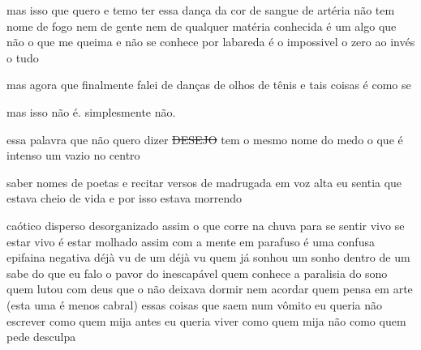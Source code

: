 \begin{poem}
\begin{stanza}
\end{stanza}
\begin{stanza}
mas isso que quero\verseline
e temo ter\verseline
essa dança da cor\verseline
de sangue de artéria\verseline
não tem nome de fogo\verseline
nem de gente\verseline
nem de qualquer\verseline
matéria conhecida\verseline
é um algo que não\verseline
o que me queima\verseline
e não se conhece por\verseline
labareda\verseline
é o impossivel\verseline
o zero ao invés\verseline
o tudo
\end{stanza}
\begin{stanza}
mas agora que finalmente falei\verseline
de danças de olhos de tênis\verseline
e tais coisas\verseline
é como se
\end{stanza}
\begin{stanza}
mas isso não é.\verseline
simplesmente não.
\end{stanza}
\begin{stanza}
essa palavra que não quero dizer\verseline
\qquad \sout{DESEJO}\verseline
tem o mesmo nome do medo\verseline
o que é intenso\verseline
um vazio no centro
\end{stanza}
\begin{stanza}
saber nomes de poetas\verseline
e recitar versos\verseline
de madrugada\verseline
em voz alta\verseline
eu sentia que estava\verseline
cheio de vida\verseline
e por isso\verseline
estava morrendo
\end{stanza}
\begin{stanza}
caótico disperso\verseline
desorganizado \qquad assim\verseline
o que corre na chuva\verseline
para se sentir vivo\verseline
se estar vivo\verseline
é estar molhado \qquad assim\verseline
com a mente em parafuso\verseline
é uma confusa\verseline
epifaina negativa \qquad déjà vu\verseline
de um déjà vu \qquad quem\verseline
já sonhou\verseline
um sonho dentro de um\verseline
\qquad sabe do que eu falo\verseline
o pavor do inescapável\verseline
\qquad quem conhece a\verseline
\qquad paralisia do sono\verseline
quem lutou com deus\verseline
que o não deixava\verseline
dormir nem acordar\verseline
\qquad quem pensa em\verseline
\qquad arte\verseline
(esta uma é menos cabral)\verseline
essas coisas que saem num vômito\verseline
eu queria não escrever\verseline
como quem mija\verseline
\qquad \qquad \qquad antes\verseline
\qquad \qquad \qquad \qquad eu queria\verseline
viver como quem mija\verseline
não como quem\verseline
pede desculpa
\end{stanza}

\end{poem}
